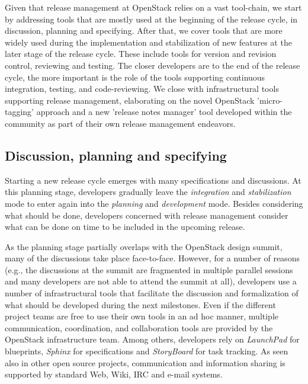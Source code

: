 \documentclass[dvipsnames]{bmcart}
\theoremstyle{definition}
\renewcommand{\newPara}[1]{#1}
\begin{document}
\newPara{
Given that release management at OpenStack relies on a vast tool-chain, we start by addressing tools that are mostly used at the beginning of the release cycle, in discussion, planning and specifying. After that, we cover tools that are more widely used during the implementation and stabilization of new features at the later stage of the release cycle. These include tools for version and revision control, reviewing and testing. The closer developers are to the end of the release cycle, the more important is the role of the tools supporting continuous integration, testing, and code-reviewing. We close with infrastructural tools supporting release management, elaborating on the novel OpenStack 'micro-tagging' approach and a new 'release notes manager' tool developed within the community as part of their own release management endeavors. 
}

\subsection{Discussion, planning and specifying}

Starting a new release cycle emerges with many specifications and discussions.  At this planning stage, developers gradually leave the \textit{integration} and \textit{stabilization} mode to enter again into the \textit{planning} and \textit{development} mode. Besides considering what should be done, developers concerned with release management consider what can be done on time to be included in the upcoming release.  

As the planning stage partially overlaps with the OpenStack design summit, many of the discussions take place face-to-face.  However, for a number of reasons (e.g., the discussions at the summit are fragmented in multiple parallel sessions and many developers are not able to attend the summit at all), developers use
a number of infrastructural tools that facilitate the discussion and formalization of what should be developed during the next milestones. Even if the different project teams are free to use their own tools in an ad hoc manner, multiple communication, coordination, and collaboration tools are provided by the OpenStack infrastructure team. Among others, developers rely on \textit{LaunchPad} for blueprints, \textit{Sphinx} for specifications and \textit{StoryBoard}  for task tracking.  As seen also in other open source projects, communication and information sharing is supported by standard Web, Wiki, IRC and e-mail systems.  
\end{document}
